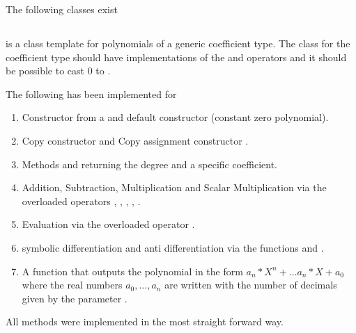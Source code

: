 		The following classes exist
		
		\subsection{\poly} 
			\textbf{} is a class template for polynomials of a generic coefficient type. 
			The class for the coefficient type should have implementations of the \code{*} and \code{+} operators
			and it should be possible to cast $0$ to .

			The following has been implemented for \poly
			\begin{enumerate}
				\item Constructor from a  and default constructor (constant zero polynomial).
				\item Copy constructor  and Copy assignment constructor .
				\item Methods  and  returning the degree and a specific coefficient.
				\item Addition, Subtraction, Multiplication and Scalar Multiplication via the overloaded operators \code{+}, \code{-}, 	\code{*}, \code{+=}, \code{*=}.
				\item Evaluation via the overloaded operator \code{()}.
				\item symbolic differentiation and anti differentiation via the functions  and .
				\item A function  that outputs the polynomial
				in the form $a_n*X^n+ \dots a_n*X + a_0$ where the real numbers $a_0, \dots, a_n$ are written with the number of decimals given by the parameter .
			\end{enumerate}
			All methods were implemented in the most straight forward way. 
